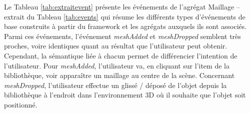 Le Tableau \ref{tab:extraitevent} présente les événements de l'agrégat Maillage -- 
extrait du Tableau \ref{tab:events} qui résume les différents types d'événements 
de base construits à partir du \gls{framework} et les agrégats auxquels ils sont 
associés. Parmi ces événements, l'événement 
\textit{meshAdded} et \textit{meshDropped} semblent très proches, voire 
identiques quant au résultat que l'utilisateur peut obtenir. Cependant, la 
sémantique liée à chacun permet de différencier l'intention de l'utilisateur. 
Pour \textit{meshAdded}, l'utilisateur va, en cliquant sur l'item de la bibliothèque, 
voir apparaître un maillage au centre de la scène. 
Concernant \textit{meshDropped}, l'utilisateur effectue un glissé / déposé de l'objet 
depuis la bibliothèque à l'endroit dans l'environnement 3D où il souhaite que l'objet 
soit positionné.



